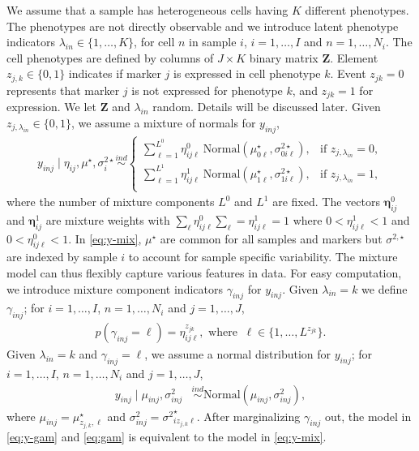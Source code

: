 \documentclass[12pt,]{article}
\newcommand{\N}{ \mathcal{N} }
\newcommand{\ind}{\overset{ind}{\sim}}
\def\bet{\bm{\eta}}
\def\N{\text{Normal}}
\def\Z{\bm{Z}}
\begin{document}
We assume that a sample has heterogeneous cells having $K$ different phenotypes.  The phenotypes are not directly observable and we introduce latent phenotype indicators \(\lambda_{in} \in \{1, \ldots, K\}\), for cell $n$ in sample $i$, \(i=1, \ldots, I\) and \(n=1, \ldots, N_i\).
The cell phenotypes are defined by columns of \(J \times K\) binary matrix \(\Z\). Element \(z_{j, k} \in \{0, 1\}\) indicates if marker \(j\) is expressed in cell phenotype \(k\). Event \(z_{jk}=0\) represents that marker \(j\) is not expressed for phenotype $k$, and \(z_{jk}=1\) for
expression. We let $\Z$ and $\lambda_{in}$ random. Details will be discussed later.  Given \(z_{j, \lambda_{in}} \in \{0, 1\}\), we assume a mixture of
normals for \(y_{inj}\),
\begin{align}
y_{inj} \mid \eta_{ij}, \mu^\star, \sigma^{2 \star}_{i} \ind
\begin{cases}
\sum_{\ell=1}^{L^0} \eta^0_{ij\ell}~ \N(\mu^\star_{0\ell}, \sigma^{2 \star}_{0i\ell}), &\mbox{if $z_{j,\lambda_{in}}=0$},\\
\sum_{\ell=1}^{L^1} \eta^1_{ij\ell}~ \N(\mu^\star_{1\ell}, \sigma^{2 \star}_{1i\ell}), &\mbox{if $z_{j,\lambda_{in}}=1$},\\
\end{cases} \label{eq:y-mix}
\end{align}
where the number of mixture components \(L^0\) and \(L^1\) are fixed.  The vectors $\bet^0_{ij}$ and $\bet^1_{ij}$ are mixture weights with \(\sum_{\ell} \eta^0_{ij\ell}\sum_{\ell}= \eta^1_{ij\ell}=1\) where \(0 < \eta^1_{ij\ell} < 1\) and \(0 < \eta^0_{ij\ell} < 1\).  In \eqref{eq:y-mix}, $\mu^\star$ are common for all samples and markers but $\sigma^{2, \star}$ are indexed by sample $i$ to account for sample specific variability.  The mixture model can thus flexibly capture various features in data.  For easy computation, we introduce mixture component indicators $\gamma_{inj}$ for $y_{inj}$.  Given \(\lambda_{in}=k\) we define
\(\gamma_{inj}\); for \(i=1, \ldots, I\), \(n=1, \ldots, N_i\) and
\(j=1, \ldots, J\),
\begin{eqnarray}
p(\gamma_{inj} = \ell)=\eta^{z_{jk}}_{ij\ell}, \mbox{ where }~ \ell \in \{1,\ldots, L^{z_{jk}}\}. \label{eq:gam}
\end{eqnarray}
Given \(\lambda_{in}=k\) and \(\gamma_{inj}=\ell\), we assume a normal
distribution for \(y_{inj}\); for \(i=1, \ldots, I\),
\(n=1, \ldots, N_i\) and \(j=1, \ldots, J\),
\begin{align}
  y_{inj} \mid \mu_{inj}, \sigma^2_{inj}  &\ind \N(\mu_{inj}, \sigma^2_{inj}), \label{eq:y-gam}
\end{align}
where \(\mu_{inj} = \mu^\star_{z_{j,k},\ell}\) and
\(\sigma^2_{inj} = {\sigma^{2}}^\star_{iz_{j,k}\ell}\). After marginalizing $\gamma_{inj}$ out, the model in \eqref{eq:y-gam} and \eqref{eq:gam} is equivalent to the model in \eqref{eq:y-mix}.  
\end{document}
